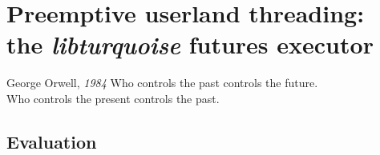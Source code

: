 \chapter{Preemptive userland threading: \\ the \textit{libturquoise} futures executor}
\label{chap:libturquoise}

\ifdefined\chapquotes
\vspace{-0.5in}
\begin{chapquote}[1.25in]{George Orwell, \textit{1984}}
Who controls the past controls the future. \\
Who controls the present controls the past.
\end{chapquote}
\fi

\begin{swallowsections}

\end{swallowsections}


\section{Evaluation}





